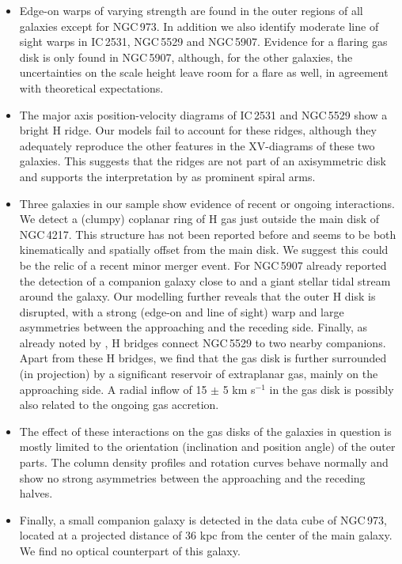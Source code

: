 \documentclass{aa}
\begin{document}
\begin{itemize}[topsep=2pt, itemsep=2pt]
\item[$\bullet$] Edge-on warps of varying strength are found in the outer regions of all galaxies except for NGC\,973. In addition we also identify moderate line of sight warps in IC\,2531, NGC\,5529 and NGC\,5907. Evidence for a flaring gas disk is only found in NGC\,5907, although, for the other galaxies, the uncertainties on the scale height leave room for a flare as well, in agreement with theoretical expectations. 
\item[$\bullet$] The major axis position-velocity diagrams of IC\,2531 and NGC\,5529 show a bright H{} ridge. Our models fail to account for these ridges, although they adequately reproduce the other features in the XV-diagrams of these two galaxies. This suggests that the ridges are not part of an axisymmetric disk and supports the interpretation by \cite{kregel04b} as prominent spiral arms.
\item[$\bullet$] Three galaxies in our sample show evidence of recent or ongoing interactions. We detect a (clumpy) coplanar ring of H{} gas just outside the main disk of NGC\,4217. This structure has not been reported before and seems to be both kinematically and spatially offset from the main disk. We suggest this could be the relic of a recent minor merger event. For NGC\,5907 \cite{shang98} already reported the detection of a companion galaxy close to and a giant stellar tidal stream around the galaxy. Our modelling further reveals that the outer H{} disk is disrupted, with a strong (edge-on and line of sight) warp and large asymmetries between the approaching and the receding side. Finally, as already noted by \cite{kregel04}, H{} bridges connect NGC\,5529 to two nearby companions. Apart from these H{} bridges, we find that the gas disk is further surrounded (in projection) by a significant reservoir of extraplanar gas, mainly on the approaching side. A radial inflow of 15 $\pm$ 5 km s$^{-1}$ in the gas disk is possibly also related to the ongoing gas accretion.
\item[$\bullet$] The effect of these interactions on the gas disks of the galaxies in question is mostly limited to the orientation (inclination and position angle) of the outer parts. The column density profiles and rotation curves behave normally and show no strong asymmetries between the approaching and the receding halves.
\item[$\bullet$] Finally, a small companion galaxy is detected in the data cube of NGC\,973, located at a projected distance of 36 kpc from the center of the main galaxy. We find no optical counterpart of this galaxy.
\end{itemize}
\end{document}
